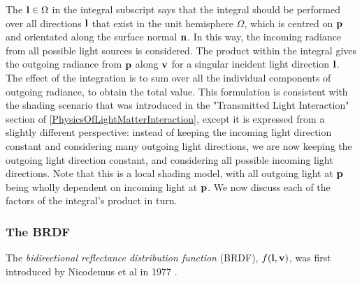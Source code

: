The \begin{math}\mathbf{l}\in\Omega\end{math} in the integral subscript says that the integral should be performed over all directions \begin{math}\mathbf{l}\end{math} that exist in the unit hemisphere \begin{math}\Omega\end{math}, which is centred on \begin{math}\mathbf{p}\end{math} and orientated along the surface normal \begin{math}\mathbf{n}\end{math}. In this way, the incoming radiance from all possible light sources is considered. The product within the integral gives the outgoing radiance from \begin{math}\mathbf{p}\end{math} along \begin{math}\mathbf{v}\end{math} for a singular incident light direction \begin{math}\mathbf{l}\end{math}. The effect of the integration is to sum over all the individual components of outgoing radiance, to obtain the total value. This formulation is consistent with the shading scenario that was introduced in the "Transmitted Light Interaction" section of \ref{PhysicsOfLightMatterInteraction}, except it is expressed from a slightly different perspective: instead of keeping the incoming light direction constant and considering many outgoing light directions, we are now keeping the outgoing light direction constant, and considering all possible incoming light directions. Note that this is a local shading model, with all outgoing light at \begin{math}\mathbf{p}\end{math} being wholly dependent on incoming light at \begin{math}\mathbf{p}\end{math}. We now discuss each of the factors of the integral's product in turn.

\subsubsection{The BRDF}

The \textit{bidirectional reflectance distribution function} (BRDF), \begin{math}f(\mathbf{l}, \mathbf{v})\end{math}, was first introduced by Nicodemus et al in 1977 \cite{OriginalBRDF}.

